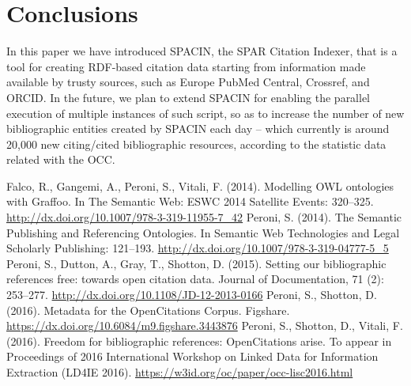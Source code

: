 \documentclass[runningheads,a4paper]{llncs}
\begin{document}
\section{Conclusions}

In this paper we have introduced SPACIN, the SPAR Citation Indexer, that is a tool for creating RDF-based citation data starting from information made available by trusty sources, such as Europe PubMed Central, Crossref, and ORCID. In the future, we plan to extend SPACIN for enabling the parallel execution of multiple instances of such script, so as to increase the number of new bibliographic entities created by SPACIN each day -- which currently is around 20,000 new citing/cited bibliographic resources, according to the statistic data related with the OCC.

\begin{thebibliography}{4}

 Falco, R., Gangemi, A., Peroni, S., Vitali, F. (2014). Modelling OWL ontologies with Graffoo. In The Semantic Web: ESWC 2014 Satellite Events: 320--325. \url{http://dx.doi.org/10.1007/978-3-319-11955-7\_42}
 Peroni, S. (2014). The Semantic Publishing and Referencing Ontologies. In Semantic Web Technologies and Legal Scholarly Publishing: 121--193. \url{http://dx.doi.org/10.1007/978-3-319-04777-5\_5}
 Peroni, S., Dutton, A., Gray, T., Shotton, D. (2015). Setting our bibliographic references free: towards open citation data. Journal of Documentation, 71 (2): 253--277. \url{http://dx.doi.org/10.1108/JD-12-2013-0166}
 Peroni, S., Shotton, D. (2016). Metadata for the OpenCitations Corpus. Figshare. \url{https://dx.doi.org/10.6084/m9.figshare.3443876}
 Peroni, S., Shotton, D., Vitali, F. (2016). Freedom for bibliographic references: OpenCitations arise. To appear in Proceedings of 2016 International Workshop on Linked Data for Information Extraction (LD4IE 2016). \url{https://w3id.org/oc/paper/occ-lisc2016.html}

\end{thebibliography}
\end{document}
